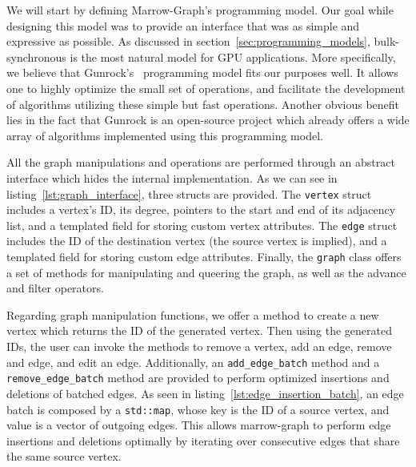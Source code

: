 We will start by defining Marrow-Graph's programming model. Our goal while designing this model was to provide an interface that was as simple and expressive as possible. As discussed in section~\ref{sec:programming_models},  bulk-synchronous is the most natural model for \gls{GPU} applications. More specifically, we believe that Gunrock's~\cite{paper:gunrock} programming model fits our purposes well. It allows one to highly optimize the small set of operations, and facilitate the development of algorithms utilizing these simple but fast operations. Another obvious benefit lies in the fact that Gunrock is an open-source project which already offers a wide array of algorithms implemented using this programming model.


All the graph manipulations and operations are performed through an abstract interface which hides the internal implementation. As we can see in listing~\ref{lst:graph_interface}, three structs are provided. The \texttt{vertex} struct includes a vertex's ID, its degree, pointers to the start and end of its adjacency list, and a templated field for storing custom vertex attributes. The \texttt{edge} struct includes the ID of the destination vertex (the source vertex is implied), and a templated field for storing custom edge attributes. Finally, the \texttt{graph} class offers a set of methods for manipulating and queering the graph, as well as the advance and filter operators.

Regarding graph manipulation functions, we offer a method to create a new vertex which returns the ID of the generated vertex. Then using the generated IDs, the user can invoke the methods to remove a vertex, add an edge, remove and edge, and edit an edge. Additionally, an \texttt{add\_edge\_batch} method and a \texttt{remove\_edge\_batch} method are provided to perform optimized insertions and deletions of batched edges. As seen in listing~\ref{lst:edge_insertion_batch}, an edge batch is composed by a \texttt{std::map}, whose key is the ID of a source vertex, and value is a vector of outgoing edges. This allows marrow-graph to perform edge insertions and deletions optimally by iterating over consecutive edges that share the same source vertex.



